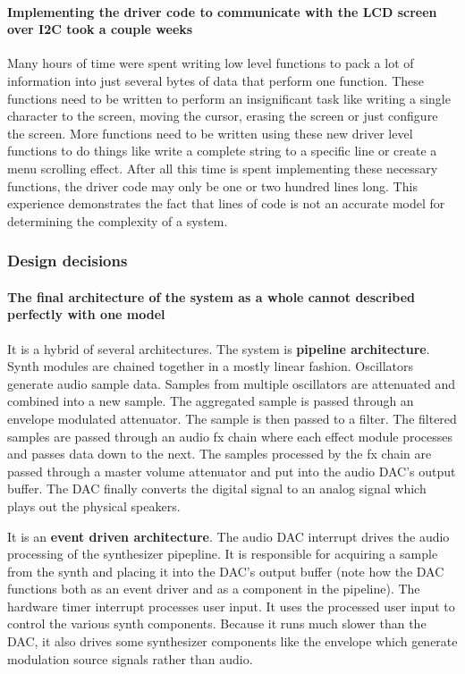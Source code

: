 \documentclass[acmlarge,screen]{acmart}
\begin{document}
	\paragraph{Implementing the driver code to communicate with the LCD screen over I2C took a couple weeks} Many hours of time were spent writing low level functions to pack a lot of information into just several bytes of data that perform one function. These functions need to be written to perform an insignificant task like writing a single character to the screen, moving the cursor, erasing the screen or just configure the screen. More functions need to be written using these new driver level functions to do things like write a complete string to a specific line or create a menu scrolling effect. After all this time is spent implementing these necessary functions, the driver code may only be one or two hundred lines long. This experience demonstrates the fact that lines of code is not an accurate model for determining the complexity of a system.
	
	\subsubsection{Design decisions}
	\paragraph{The final architecture of the system as a whole cannot described perfectly with one model} It is a hybrid of several architectures. The system is \textbf{pipeline architecture}. Synth modules are chained together in a mostly linear fashion. Oscillators generate audio sample data. Samples from multiple oscillators are attenuated and combined into a new sample. The aggregated sample is passed through an envelope modulated attenuator. The sample is then passed to a filter. The filtered samples are passed through an audio fx chain where each effect module processes and passes data down to the next. The samples processed by the fx chain are passed through a master volume attenuator and put into the audio DAC's output buffer. The DAC finally converts the digital signal to an analog signal which plays out the physical speakers.
	
	It is an \textbf{event driven architecture}. The audio DAC interrupt drives the audio processing of the synthesizer pipepline. It is responsible for acquiring a sample from the synth and placing it into the DAC's output buffer (note how the DAC functions both as an event driver and as a component in the pipeline). The hardware timer interrupt processes user input. It uses the processed user input to control the various synth components. Because it runs much slower than the DAC, it also drives some synthesizer components like the envelope which generate modulation source signals rather than audio.
	
\end{document}

